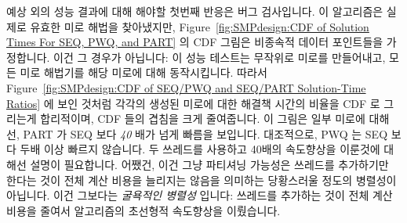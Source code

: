 예상 외의 성능 결과에 대해 해야할 첫번째 반응은 버그 검사입니다.
이 알고리즘은 실제로 유효한 미로 해법을 찾아냈지만,
Figure~\ref{fig:SMPdesign:CDF of Solution Times For SEQ, PWQ, and PART}
의 CDF 그림은 비종속적 데이터 포인트들을 가정합니다.
이건 그 경우가 아닙니다:  이 성능 테스트는 무작위로 미로를 만들어내고, 모든
미로 해법기를 해당 미로에 대해 동작시킵니다.
따라서
Figure~\ref{fig:SMPdesign:CDF of SEQ/PWQ and SEQ/PART Solution-Time Ratios}
에 보인 것처럼 각각의 생성된 미로에 대한 해결책 시간의 비율을 CDF 로 그리는게
합리적이며, CDF 들의 겹침을 크게 줄여줍니다.
이 그림은 일부 미로에 대해선, PART 가 SEQ 보다 \emph{40} 배가 넘게 빠름을
보입니다.
대조적으로, PWQ 는 SEQ 보다 두배 이상 빠르지 않습니다.
두 쓰레드를 사용하고 40배의 속도향상을 이룬것에 대해선 설명이 필요합니다.
어쨌건, 이건 그냥 파티셔닝 가능성은 쓰레드를 추가하기만 한다는 것이 전체 계산
비용을 늘리지는 않음을 의미하는 당황스러울 정도의 병렬성이 아닙니다.
이건 그보다는 \emph{굴욕적인 병렬성} 입니다: 쓰레드를 추가하는 것이 전체 계산
비용을 줄여서 알고리즘의 초선형적 속도향상을 이뤘습니다.

